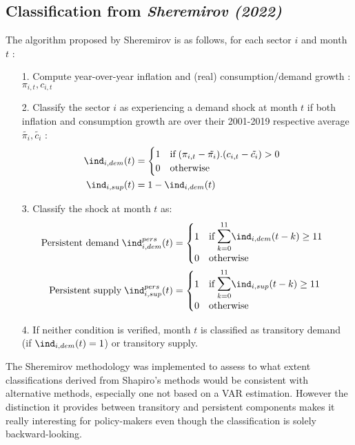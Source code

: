 \subsection{Classification from \textit{Sheremirov (2022)}}

\quad The algorithm proposed by Sheremirov is as follows, for each sector $i$ and month $t$ :
\begin{itemize}
    \item[1.] Compute year-over-year inflation and (real) consumption/demand growth : $\pi_{i,t},c_{i,t}$
    \item[2.] Classify the sector $i$ as experiencing a demand shock at month $t$ if both inflation and consumption growth are over their 2001-2019 respective average $\tilde{\pi_i},\tilde{c_i}$ : 
    \begin{align*}
        \ind_{i,dem}(t) &= \begin{cases} 1 \quad \textrm{if} \; (\pi_{i,t}-\tilde{\pi_i}).(c_{i,t}-\tilde{c_i})>0 \\ 0 \quad \textrm{otherwise} \end{cases} \\ 
        \ind_{i,sup}(t) &= 1 - \ind_{i,dem}(t)
    \end{align*}
    \item[3.] Classify the shock at month $t$ as:
    \begin{align*}
        \textrm{Persistent demand} \; \ind_{i,dem}^{pers}(t) &= \begin{cases} 1 \quad \textrm{if} \; \mathlarger{\mathlarger{\sum}}_{k=0}^{11} \ind_{i,dem}(t-k) \geq 11 \\ 0 \quad \textrm{otherwise} \end{cases} \\ 
        \textrm{Persistent supply} \; \ind_{i,sup}^{pers}(t) &= \begin{cases} 1 \quad \textrm{if} \; \mathlarger{\mathlarger{\sum}}_{k=0}^{11} \ind_{i,sup}(t-k) \geq 11 \\ 0 \quad \textrm{otherwise} \end{cases} \\ 
    \end{align*}
    \item[4.] If neither condition is verified, month $t$ is classified as transitory demand (if $\ind_{i,dem}(t)=1$) or transitory supply.
\end{itemize}
\quad The Sheremirov methodology was implemented to assess to what extent classifications derived from Shapiro's methods would be consistent with alternative methods, especially one not based on a VAR estimation. 
However the distinction it provides between transitory and persistent components makes it really interesting for policy-makers even though the classification is solely backward-looking.
\bigbreak

